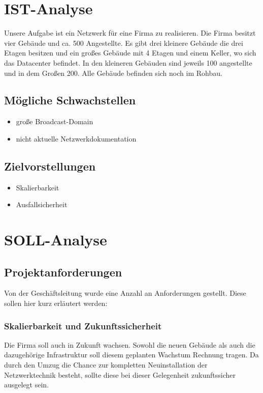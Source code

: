 \documentclass[a4paper,11pt]{article}
\begin{document}
\section{IST-Analyse}
Unsere Aufgabe ist ein Netzwerk für eine Firma zu realisieren. Die Firma besitzt vier Gebäude und ca. 500 Angestellte. Es gibt drei kleinere Gebäude die drei Etagen besitzen und ein großes Gebäude mit 4 Etagen und einem Keller, wo sich das Datacenter befindet. In den kleineren Gebäuden sind jeweils 100 angestellte und in dem Großen 200. Alle Gebäude befinden sich noch im Rohbau. 
\\
\subsection{Mögliche Schwachstellen}
    \begin{itemize}
        \item große Broadcast-Domain
        \item nicht aktuelle Netzwerkdokumentation
        \\
    \end{itemize}

\subsection{Zielvorstellungen}
    \begin{itemize}
        \item Skalierbarkeit
        \item Ausfallsicherheit
        \\
    \end{itemize}




\section{SOLL-Analyse}
\subsection{Projektanforderungen}
Von der Geschäftsleitung wurde eine Anzahl an Anforderungen gestellt. Diese sollen hier kurz erläutert werden:
\subsubsection{Skalierbarkeit und Zukunftssicherheit}
Die Firma soll auch in Zukunft wachsen. Sowohl die neuen Gebäude als auch die dazugehörige Infrastruktur soll diesem geplanten Wachstum Rechnung tragen. Da durch den Umzug die Chance zur kompletten Neuinstallation der Netzwerktechnik besteht, sollte diese bei dieser Gelegenheit zukunftssicher ausgelegt sein.
\end{document}
